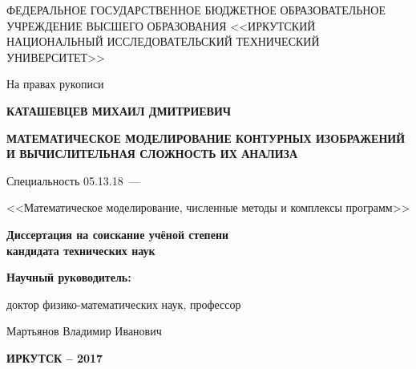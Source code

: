 \thispagestyle{empty}

\begin{center}
\MakeTextUppercase{ФЕДЕРАЛЬНОЕ ГОСУДАРСТВЕННОЕ БЮДЖЕТНОЕ ОБРАЗОВАТЕЛЬНОЕ 
УЧРЕЖДЕНИЕ ВЫСШЕГО ОБРАЗОВАНИЯ <<ИРКУТСКИЙ НАЦИОНАЛЬНЫЙ ИССЛЕДОВАТЕЛЬСКИЙ ТЕХНИЧЕСКИЙ УНИВЕРСИТЕТ>>}
\par
\end{center}

\vspace{5mm}
\begin{flushright}
На правах рукописи

\end{flushright}

\vspace{10mm}
\begin{center}
{\bf КАТАШЕВЦЕВ МИХАИЛ ДМИТРИЕВИЧ}
\end{center}

\vspace{5mm}
\begin{center}
{\bf \large \MakeTextUppercase{Математическое моделирование контурных изображений и вычислительная сложность их анализа
}
\par}

\vspace{10mm}
{%
Специальность 05.13.18~---

<<Математическое моделирование, численные методы и комплексы программ>>
}

\vspace{10mm}
\textbf{Диссертация
на соискание учёной степени}
\\
\textbf{кандидата технических наук}

\end{center}

\vspace{20mm}
\begin{flushright}
{\bf
Научный руководитель:

доктор физико-математических наук, профессор

Мартьянов Владимир Иванович
}
\end{flushright}

\vspace{20mm}
\begin{center}
\textbf{\MakeTextUppercase{Иркутск -- 2017}}
\end{center}

\newpage